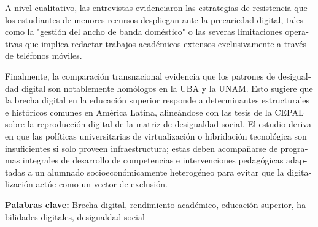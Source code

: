 \documentclass{article}
\begin{document}
\begin{tcolorbox}[colback=brown!8!white,colframe=brown!8!white,boxrule=0pt,arc=2pt,left=4pt,right=4pt,top=3pt,bottom=3pt,before skip=4pt,after skip=4pt]
\begin{otherlanguage}{spanish}
A nivel cualitativo, las entrevistas evidenciaron las estrategias de resistencia que los estudiantes de menores recursos despliegan ante la precariedad digital, tales como la "gestión del ancho de banda doméstico" o las severas limitaciones operativas que implica redactar trabajos académicos extensos exclusivamente a través de teléfonos móviles.

Finalmente, la comparación transnacional evidencia que los patrones de desigualdad digital son notablemente homólogos en la UBA y la UNAM. Esto sugiere que la brecha digital en la educación superior responde a determinantes estructurales e históricos comunes en América Latina, alineándose con las tesis de la CEPAL sobre la reproducción digital de la matriz de desigualdad social. El estudio deriva en  que las políticas universitarias de virtualización o hibridación tecnológica son insuficientes si solo proveen infraestructura; estas deben acompañarse de programas integrales de desarrollo de competencias e intervenciones pedagógicas adaptadas a un alumnado socioeconómicamente heterogéneo para evitar que la digitalización actúe como un vector de exclusión.
\par\smallskip\noindent\textbf{Palabras clave:} Brecha digital, rendimiento académico, educación superior, habilidades digitales, desigualdad social
\end{otherlanguage}
\end{tcolorbox}
\end{document}
